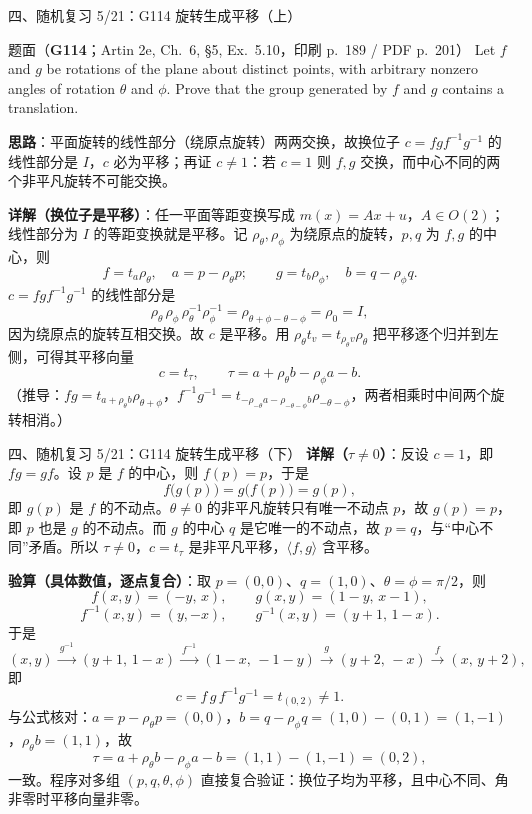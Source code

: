 \documentclass[aspectratio=169,10pt,fontset=none]{ctexbeamer}
\newcommand{\ex}[1]{\textcolor{accent}{\footnotesize\bfseries #1}}
\newcommand{\key}[1]{\textcolor{ink}{\bfseries #1}}
\begin{document}
\begin{frame}[t]{四、随机复习 5/21：G114 旋转生成平移（上）}
\label{ex:G114}
\scriptsize
\begin{block}{\footnotesize 题面（\ex{G114}；Artin 2e, Ch.~6, §5, Ex.~5.10，印刷 p.~189 / PDF p.~201）}
Let $f$ and $g$ be rotations of the plane about distinct points, with arbitrary nonzero angles of rotation $\theta$ and $\phi$. Prove that the group generated by $f$ and $g$ contains a translation.
\end{block}
\key{思路}：平面旋转的线性部分（绕原点旋转）两两交换，故换位子 $c=fgf^{-1}g^{-1}$ 的线性部分是 $I$，$c$ 必为平移；再证 $c\ne1$：若 $c=1$ 则 $f,g$ 交换，而中心不同的两个非平凡旋转不可能交换。

\key{详解（换位子是平移）}：任一平面等距变换写成 $m(x)=Ax+u$，$A\in O(2)$；线性部分为 $I$ 的等距变换就是平移。记 $\rho_\theta,\rho_\phi$ 为绕原点的旋转，$p,q$ 为 $f,g$ 的中心，则
\[ f=t_a\rho_\theta,\quad a=p-\rho_\theta p;\qquad g=t_b\rho_\phi,\quad b=q-\rho_\phi q. \]
$c=fgf^{-1}g^{-1}$ 的线性部分是
\[ \rho_\theta\,\rho_\phi\,\rho_\theta^{-1}\rho_\phi^{-1}=\rho_{\theta+\phi-\theta-\phi}=\rho_0=I, \]
因为绕原点的旋转互相交换。故 $c$ 是平移。用 $\rho_\theta t_v=t_{\rho_\theta v}\rho_\theta$ 把平移逐个归并到左侧，可得其平移向量
\[ c=t_\tau,\qquad \tau=a+\rho_\theta b-\rho_\phi a-b. \]
（推导：$fg=t_{a+\rho_\theta b}\rho_{\theta+\phi}$，$f^{-1}g^{-1}=t_{-\rho_{-\theta}a-\rho_{-\theta-\phi}b}\rho_{-\theta-\phi}$，两者相乘时中间两个旋转相消。）
\end{frame}

\begin{frame}[t]{四、随机复习 5/21：G114 旋转生成平移（下）}
\scriptsize
\key{详解（$\tau\ne0$）}：反设 $c=1$，即 $fg=gf$。设 $p$ 是 $f$ 的中心，则 $f(p)=p$，于是
\[ f\bigl(g(p)\bigr)=g\bigl(f(p)\bigr)=g(p), \]
即 $g(p)$ 是 $f$ 的不动点。$\theta\ne0$ 的非平凡旋转只有唯一不动点 $p$，故 $g(p)=p$，即 $p$ 也是 $g$ 的不动点。而 $g$ 的中心 $q$ 是它唯一的不动点，故 $p=q$，与“中心不同”矛盾。所以 $\tau\ne0$，$c=t_\tau$ 是非平凡平移，$\langle f,g\rangle$ 含平移。

\key{验算（具体数值，逐点复合）}：取 $p=(0,0)$、$q=(1,0)$、$\theta=\phi=\pi/2$，则
\[ f(x,y)=(-y,\,x),\qquad g(x,y)=(1-y,\,x-1), \]
\[ f^{-1}(x,y)=(y,-x),\qquad g^{-1}(x,y)=(y+1,\,1-x). \]
于是
\[ (x,y)\xrightarrow{\ g^{-1}\ }(y+1,\,1-x)\xrightarrow{\ f^{-1}\ }(1-x,\,-1-y)\xrightarrow{\ g\ }(y+2,\,-x)\xrightarrow{\ f\ }(x,\,y+2), \]
即
\[ c=f\,g\,f^{-1}g^{-1}=t_{(0,2)}\ne1. \]
与公式核对：$a=p-\rho_\theta p=(0,0)$，$b=q-\rho_\phi q=(1,0)-(0,1)=(1,-1)$，$\rho_\theta b=(1,1)$，故
\[ \tau=a+\rho_\theta b-\rho_\phi a-b=(1,1)-(1,-1)=(0,2), \]
一致。程序对多组 $(p,q,\theta,\phi)$ 直接复合验证：换位子均为平移，且中心不同、角非零时平移向量非零。
\end{frame}
\end{document}
